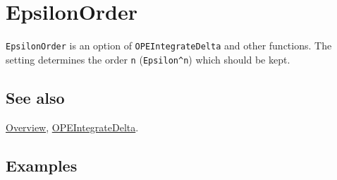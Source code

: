 \documentclass[../FeynCalcManual.tex]{subfiles}
\begin{document}
\hypertarget{epsilonorder}{
\section{EpsilonOrder}\label{epsilonorder}}

\texttt{EpsilonOrder} is an option of \texttt{OPEIntegrateDelta} and
other functions. The setting determines the order \texttt{n}
(\texttt{Epsilon^n}) which should be kept.

\subsection{See also}

\hyperlink{toc}{Overview},
\hyperlink{opeintegratedelta}{OPEIntegrateDelta}.

\subsection{Examples}
\end{document}
